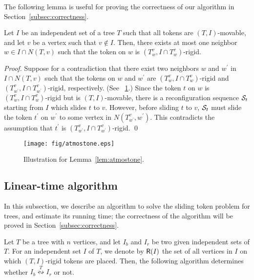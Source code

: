 \documentclass{llncs}
\newcommand{\Nei}[2]{N(#1,#2)}
\newcommand{\Tsub}[2]{T_{#1}^{#2}}
\newcommand{\bfI}{I}
\newcommand{\calS}{{\cal S}}
\newcommand{\sevstep}{\leftrightsquigarrow}
\newcommand{\sevstepT}[1]{\overset{#1}{\sevstep}}
\newcommand{\ImSet}[1]{{\sf R}(\bfI_{#1})}
\newcounter{one}
\newcounter{two}
\begin{document}
	The following lemma is useful for proving the correctness of our algorithm in Section~\ref{subsec:correctness}.
	\begin{lemma} \label{lem:atmostone}
	Let $\bfI$ be an independent set of a tree $T$ such that all tokens are $(T, \bfI)$-movable, and let $v$ be a vertex such that $v \not\in \bfI$. 
	Then, there exists at most one neighbor $w \in \bfI \cap \Nei{T}{v}$ such that the token on $w$ is $(\Tsub{w}{v}, \bfI \cap \Tsub{w}{v})$-rigid. 
	\end{lemma}
	\begin{proof}
	Suppose for a contradiction that there exist two neighbors $w$ and $w^\prime$ in $\bfI \cap \Nei{T}{v}$ such that the tokens on $w$ and $w^\prime$ are $(\Tsub{w}{v}, \bfI \cap \Tsub{w}{v})$-rigid and $(\Tsub{w^\prime}{v}, \bfI \cap \Tsub{w^\prime}{v})$-rigid, respectively.
(See \figurename~\ref{fig:atmostone}.)
Since the token $t$ on $w$ is $(\Tsub{w}{v}, \bfI \cap \Tsub{w}{v})$-rigid but is $(T,\bfI)$-movable, there is a reconfiguration sequence $\calS_t$ starting from $\bfI$ which slides $t$ to $v$. 
	However, before sliding $t$ to $v$, $\calS_t$ must slide the token $t^\prime$ on $w^\prime$ to some vertex in $\Nei{\Tsub{w^\prime}{v}}{w^\prime}$. 
	This contradicts the assumption that $t^\prime$ is $(\Tsub{w^\prime}{v}, \bfI \cap \Tsub{w^\prime}{v})$-rigid.
	\qed
	\end{proof}
\begin{figure}[t]
\begin{center}
	\texttt{[image: fig/atmostone.eps]}
	\end{center}
	\vspace{-1em}
	\caption{Illustration for Lemma~\ref{lem:atmostone}.}
	\label{fig:atmostone}
\end{figure}

	
	\subsection{Linear-time algorithm}
	\label{subsec:algorithm}
	
	In this subsection, we describe an algorithm to solve the {\sc sliding token} problem for trees, and estimate its running time;
the correctness of the algorithm will be proved in Section~\ref{subsec:correctness}. 
\smallskip

	Let $T$ be a tree with $n$ vertices, and let $\bfI_b$ and $\bfI_r$ be two given independent sets of $T$. 
	For an independent set $\bfI$ of $T$, we denote by $\ImSet{}$ the set of all vertices in $\bfI$ on which $(T, \bfI)$-rigid tokens are placed. 
	Then, the following algorithm determines whether $\bfI_b \sevstepT{T} \bfI_r$ or not.
\smallskip
\end{document}
